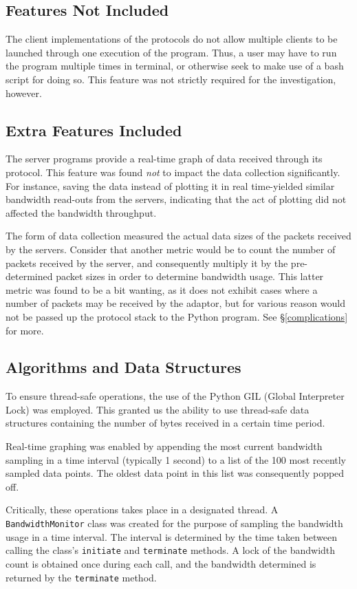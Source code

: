 \documentclass[10pt,a4paper]{article}
\begin{document}
\subsection{Features Not Included}
The client implementations of the protocols do not allow multiple clients to be launched through one
execution of the program. Thus, a user may have to run the program multiple times in terminal, or otherwise
seek to make use of a bash script for doing so. This feature was not strictly required for the investigation, however.

\subsection{Extra Features Included}
The server programs provide a real-time graph of data received through its protocol. This feature was found \emph{not} to impact the
data collection significantly. For instance, saving the data instead of plotting it in real time-yielded similar bandwidth read-outs
from the servers, indicating that the act of plotting did not affected the bandwidth throughput. 

The form of data collection measured the actual data sizes of the packets received by the servers. Consider that another metric 
would be to count the number of packets received by the server, and consequently multiply it by the pre-determined packet sizes
in order to determine bandwidth usage. This latter metric was found to be a bit wanting, as it does not exhibit cases where a number
of packets may be received by the adaptor, but for various reason would not be passed up the protocol stack to the Python program. See
\S\ref{complications} for more. 

\subsection{Algorithms and Data Structures}
To ensure thread-safe operations, the use of the Python GIL (Global Interpreter Lock) was employed. This granted us
the ability to use thread-safe data structures containing the number of bytes received in a certain time period. 

Real-time graphing was enabled by appending the most current bandwidth sampling in a time interval (typically 1 second)
to a list of the 100 most recently sampled data points. The oldest data point in this list was consequently popped off.

Critically, these operations takes place in a designated thread. A \texttt{BandwidthMonitor} class was created for the purpose
of sampling the bandwidth usage in a time interval. The interval is determined by the time taken between calling the class's 
\texttt{initiate} and \texttt{terminate} methods. A lock of the bandwidth count is obtained once during each call, and the
bandwidth determined is returned by the \texttt{terminate} method.
\end{document}
